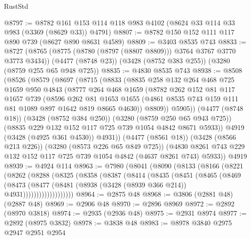 \begin{lexlean}{RustStd}
\begin{coremodule}
@8797 := @8782 @161 @153 @114 @118 @983 @4102 (@8624 @33 @114 @33 @983 (@3369 (@8629 @33)) @4791)
@8807 := @8782 @150 @152 @111 @117 @890 @739 (@8627 @890 @8631 @4589)
@8809 := @3403 @8535 @743
@8833 := @8727
    (@8765 (@8775 (@8780 (@8797 (@8807 @8809))) @3764 @3767 @3770 @3773 @3434))
    (@4477 (@8748 @23))
    (@3428 (@8752 @383 @255))
    (@3280 (@8759 @255 @65 @948 @725))
@8835 := @4830 @8535 @743
@8938 := @8508
    (@8526
      (@8579
        (@8697
          (@8715
            (@8833
              (@8835
                @258
                @132
                @264
                @468
                @725
                @1659
                @950
                @4843
                (@8777
                  @264
                  @468
                  @1659
                  (@8782
                    @262
                    @152
                    @81
                    @117
                    @1657
                    @739
                    (@8596
                      @262
                      @81
                      @1653
                      @1655
                      (@4861 @8535 @743 @159 @111 @81 @1089 @897 @1642 @819 @8665 @4630))
                    @8809))
                @5905))
            (@4477 (@8748 @18))
            (@3428 (@8752 @384 @250))
            (@3280 (@8759 @250 @65 @943 @725))
            (@8835 @229 @132 @152 @117 @725 @739 @1054 @4842 @8671 @5933))
          @4919
          (@3428 (@4925 @361 @4530))
          @4931))
      (@4477 (@8561 @18))
      (@3428 (@8566 @213 @226))
      (@3280 (@8573 @226 @65 @849 @725))
      (@4830 @8261 @743 @229 @132 @152 @117 @725 @739 @1054 @4842 (@4637 @8261 @743) @5933))
    @4919
@8939 := @4924 @114
@8963 := @7980
    (@8041
      (@8090
        (@8133
          (@8166
            (@8221
              (@8262
                (@8288
                  (@8325
                    (@8358
                      (@8387
                        (@8414
                          (@8435
                            (@8451
                              (@8465
                                (@8469
                                  (@8473
                                    (@8477
                                      (@8481
                                        (@8938 (@3428 (@8939 @366 @214)) @4931)))))))))))))))))))
@8964 := @2875 @48
@8968 := @3806 (@2881 @48) (@2887 @48)
@8969 := @2906 @48
@8970 := @2896 @8969
@8972 := @2892 (@8970 @3818)
@8974 := @2935 (@2936 @48)
@8975 := @2931 @8974
@8977 := @2892 (@8975 @3832)
@8978 := @3838 @48
@8983 := @8978 @3840 @2975 @2947 @2951 @2954

\end{coremodule}
\end{lexlean}
